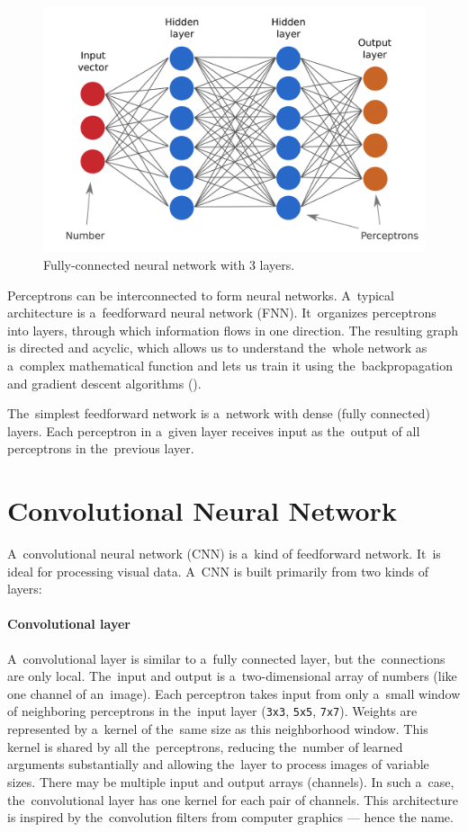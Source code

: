 \begin{figure}[h]
    \centering
    \includegraphics[width=140mm]{../img/neural-network}
    \caption{Fully-connected neural network with 3 layers.}
    \label{fig3:NeuralNetwork}
\end{figure}

Perceptrons can be interconnected to form neural networks. A~typical architecture is a~feedforward neural network (FNN). It~organizes perceptrons into layers, through which information flows in one direction. The resulting graph is directed and acyclic, which allows us to understand the~whole network as a~complex mathematical function and lets us train it using the~backpropagation and gradient descent algorithms (\cite{Goodfellow-et-al-2016}).

The~simplest feedforward network is a~network with dense (fully connected) layers. Each perceptron in a~given layer receives input as the~output of all perceptrons in the~previous layer.


\section{Convolutional Neural Network}

A~convolutional neural network (CNN) is a~kind of feedforward network. It~is ideal for processing visual data. A~CNN is built primarily from two kinds of layers:

\paragraph{Convolutional layer} A~convolutional layer is similar to a~fully connected layer, but the~connections are only local. The~input and output is a~two-dimensional array of numbers (like one channel of an~image). Each perceptron takes input from only a~small window of neighboring perceptrons in the~input layer (\texttt{3x3}, \texttt{5x5}, \texttt{7x7}). Weights are represented by a~kernel of the~same size as this neighborhood window. This kernel is shared by all the~perceptrons, reducing the~number of learned arguments substantially and allowing the~layer to process images of variable sizes. There may be multiple input and output arrays (channels). In such a~case, the~convolutional layer has one kernel for each pair of channels. This architecture is inspired by the~convolution filters from computer graphics --- hence the name.

